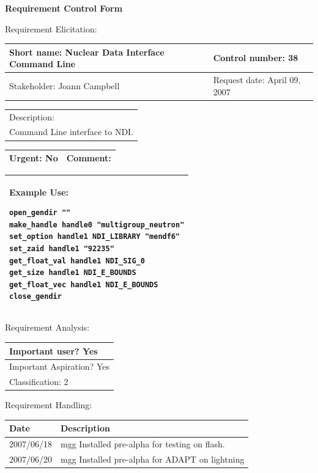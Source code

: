 \begin{center}\Large\bf
Requirement Control Form
\end{center}
\vspace{24pt}

Requirement Elicitation:

\begin{tabular}{|p{211pt}|p{211pt}|} \hline
Short name: Nuclear Data Interface Command Line & Control number: 38\\ \hline
Stakeholder: Joann Campbell & Request date: April 09, 2007\\
\end{tabular}
\begin{tabular}{|p{433pt}|} \hline
Description: \\ 
Command Line interface to NDI.\\
\hline
\end{tabular} 
\begin{tabular}{|p{211pt}|p{211pt}|} \hline
Urgent: No & Comment: \\ \hline
\end{tabular}

\vspace{12pt}

\begin{tabular}{|p{433pt}|} \hline
Example Use: 
\begin{verbatim}
open_gendir ""
make_handle handle0 "multigroup_neutron"
set_option handle1 NDI_LIBRARY "mendf6"
set_zaid handle1 "92235"
get_float_val handle1 NDI_SIG_0
get_size handle1 NDI_E_BOUNDS
get_float_vec handle1 NDI_E_BOUNDS
close_gendir
\end{verbatim}
\\ \hline
\end{tabular}
\vspace{24pt}

Requirement Analysis:

\begin{tabular}{|p{433pt}|} \hline
Important user? Yes \\ \hline
Important Aspiration? Yes \\ \hline
Classification: 2 \\ \hline
\end{tabular}
\vspace{24pt}

Requirement Handling:

\begin{tabular}{|p{72pt}|p{351pt}|} \hline
Date & Description \\ \hline
2007/06/18 & mgg Installed pre-alpha for testing on flash. \\ \hline
2007/06/20 & mgg Installed pre-alpha for ADAPT on lightning \\ \hline

\end{tabular}
